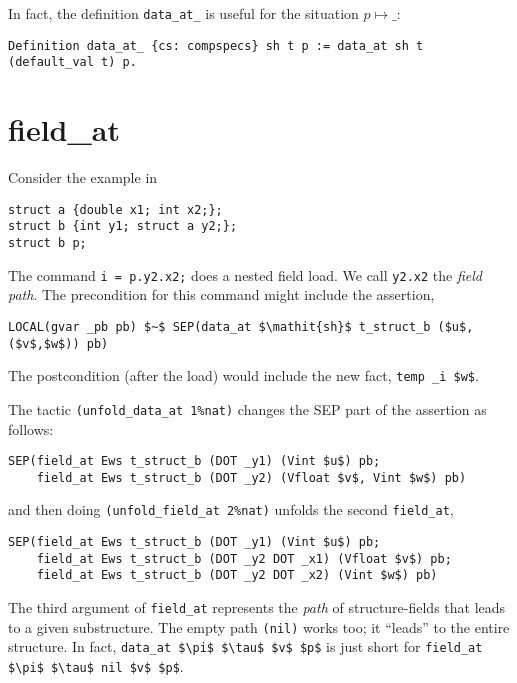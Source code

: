 \documentclass[12pt,fleqn,openany,oneside,showtrims]{memoir}
\begin{document}
In fact, the definition \lstinline{data_at_} is useful
for the situation $p \mapsto \_$:

\begin{lstlisting}
Definition data_at_ {cs: compspecs} sh t p := data_at sh t (default_val t) p.
\end{lstlisting}

\chapter{\upshape field\_at}
\label{refcard:field-at}
\label{refcard:nested-load} %

Consider the example in 
\begin{lstlisting}
struct a {double x1; int x2;};
struct b {int y1; struct a y2;};
struct b p;
\end{lstlisting}
The command  \lstinline{i = p.y2.x2;} does a nested field load.
We call \lstinline{y2.x2} the \emph{field path}.
The precondition for this command might include the assertion,
\begin{lstlisting}
LOCAL(gvar _pb pb) $~$ SEP(data_at $\mathit{sh}$ t_struct_b ($u$,($v$,$w$)) pb)
\end{lstlisting}
The postcondition (after the load) would include the new \LOCAL{} fact,
\lstinline{temp _i $w$}.

The tactic \lstinline{(unfold_data_at 1%nat)}
\label{refcard:unfold-data-at}
changes the SEP part of the assertion as follows:
\begin{lstlisting}
SEP(field_at Ews t_struct_b (DOT _y1) (Vint $u$) pb;
    field_at Ews t_struct_b (DOT _y2) (Vfloat $v$, Vint $w$) pb)
\end{lstlisting}
and then doing \lstinline{(unfold_field_at 2%nat)}
unfolds the second \lstinline{field_at},
\begin{lstlisting}
SEP(field_at Ews t_struct_b (DOT _y1) (Vint $u$) pb;
    field_at Ews t_struct_b (DOT _y2 DOT _x1) (Vfloat $v$) pb;
    field_at Ews t_struct_b (DOT _y2 DOT _x2) (Vint $w$) pb)
\end{lstlisting}
The third argument of \lstinline{field_at} represents
the \emph{path} of structure-fields that leads to a given
substructure.  The empty path \lstinline{(nil)}
works too; it ``leads'' to the entire structure.
In fact,
\lstinline{data_at $\pi$ $\tau$ $v$ $p$} is just short for
\lstinline{field_at $\pi$ $\tau$ nil $v$ $p$}.
\end{document}
